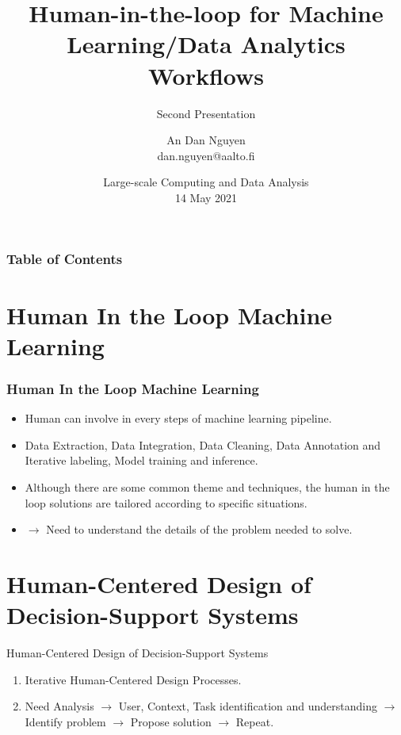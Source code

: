 \documentclass{beamer}
\title[HITL ML/DA Workflows] %
{Human-in-the-loop for Machine Learning/Data Analytics Workflows}
\subtitle{Second Presentation}
\author[An Dan Nguyen] %
{An Dan Nguyen\\dan.nguyen@aalto.fi}
\date[LSCA-2021] %
{Large-scale Computing and Data Analysis\\14 May 2021}
\begin{document}
\frame{\titlepage}

\begin{frame}
\frametitle{Table of Contents}
\tableofcontents
\end{frame}


\section{Human In the Loop Machine Learning}
\begin{frame}
\frametitle{Human In the Loop Machine Learning}

\begin{itemize}
    \item <1-> Human can involve in every steps of machine learning pipeline.
    \item <2-> Data Extraction, Data Integration, Data Cleaning, Data
Annotation and Iterative labeling, Model training and inference.
    \item <3-> Although there are some common theme and techniques, the human in the loop solutions are tailored according to specific situations. 
    \item <4-> $\rightarrow$ Need to understand the details of the problem needed to solve.
\end{itemize}

\end{frame}


\section{Human-Centered Design of Decision-Support Systems}
\begin{frame}{Human-Centered Design of Decision-Support Systems \cite{smith2009human}}
\begin{enumerate}
    \item <1-> Iterative Human-Centered Design Processes.
    \item <2-> Need Analysis $\rightarrow$ User, Context, Task identification and understanding $\rightarrow$ Identify problem $\rightarrow$ Propose solution $\rightarrow$ Repeat.
\end{enumerate}
\end{frame}
\end{document}
